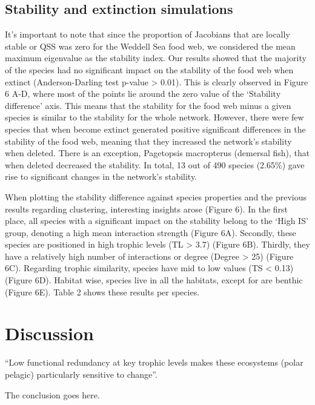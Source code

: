 \documentclass[gc, manuscript]{copernicus}
\begin{document}
\subsection{Stability and extinction simulations}

It's important to note that since the proportion of Jacobians that are
locally stable or QSS was zero for the Weddell Sea food web, we
considered the mean maximum eigenvalue as the stability index. Our
results showed that the majority of the species had no significant
impact on the stability of the food web when extinct (Anderson-Darling
test p-value \textgreater{} 0.01). This is clearly observed in Figure 6
A-D, where most of the points lie around the zero value of the
`Stability difference' axis. This means that the stability for the food
web minus a given species is similar to the stability for the whole
network. However, there were few species that when become extinct
generated positive significant differences in the stability of the food
web, meaning that they increased the network's stability when deleted.
There is an exception, Pagetopsis macropterus (demersal fish), that when
deleted decreased the stability. In total, 13 out of 490 species
(2.65\%) gave rise to significant changes in the network's stability.

When plotting the stability difference against species properties and
the previous results regarding clustering, interesting insights arose
(Figure 6). In the first place, all species with a significant impact on
the stability belong to the `High IS' group, denoting a high mean
interaction strength (Figure 6A). Secondly, these species are positioned
in high trophic levels (TL \textgreater{} 3.7) (Figure 6B). Thirdly,
they have a relatively high number of interactions or degree (Degree
\textgreater{} 25) (Figure 6C). Regarding trophic similarity, species
have mid to low values (TS \textless{} 0.13) (Figure 6D). Habitat wise,
species live in all the habitats, except for are benthic (Figure 6E).
Table 2 shows these results per species.

\section{Discussion}

``Low functional redundancy at key trophic levels makes these ecosystems
(polar pelagic) particularly sensitive to change''. \citep{Murphy2016}

\clearpage
\conclusions[Conclusions]

The conclusion goes here.
\end{document}
